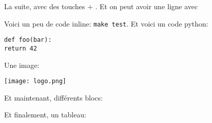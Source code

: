 \documentclass[small]{zmdocument}
\begin{document}
La suite, avec des touches  + . Et on peut avoir une ligne avec

\horizontalLine

Voici un peu de code inline: \verb`make test`. Et voici un code python:

\begin{verbatim}
def foo(bar):
return 42
\end{verbatim}

Une image: 

\begin{center}
\texttt{[image: logo.png]}
\end{center}

Et maintenant, différents blocs:

\begin{Information}
\blindtext
\end{Information}

\begin{Question}
\blindtext
\end{Question}

\begin{Warning}
\blindtext
\end{Warning}

\begin{Error}
\blindtext
\end{Error}

Et finalement, un tableau:
\end{document}
